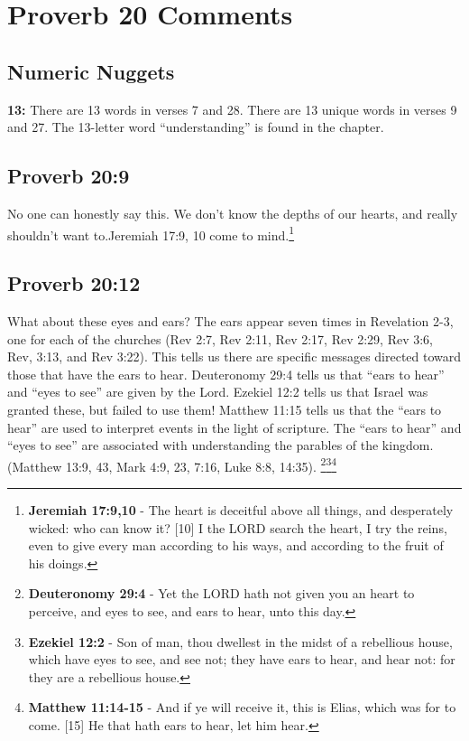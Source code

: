 \section{Proverb 20 Comments}

\subsection{Numeric Nuggets}
\textbf{13:} There are 13 words in verses 7 and 28. There are 13 unique words in verses 9 and 27. The 13-letter word ``understanding'' is found in the chapter.

\subsection{Proverb 20:9}
No one can honestly say this. We don't know the depths of our hearts, and really shouldn't want to.Jeremiah 17:9, 10 come to mind.\footnote{\textbf{Jeremiah 17:9,10} - The heart is deceitful above all things, and desperately wicked: who can know it? [10] I the LORD search the heart, I try the reins, even to give every man according to his ways, and according to the fruit of his doings.}

\subsection{Proverb 20:12}
What about these eyes and ears? The ears appear seven times in Revelation 2-3, one for each of the churches (Rev 2:7, Rev 2:11, Rev 2:17, Rev 2:29, Rev 3:6, Rev, 3:13, and Rev 3:22). This tells us there are specific messages directed toward those that have the ears to hear. Deuteronomy 29:4 tells us that ``ears to hear'' and ``eyes to see'' are given by the Lord. Ezekiel 12:2 tells us that Israel was granted these, but failed to use them! Matthew 11:15 tells us that the ``ears to hear'' are used to interpret events in the light of scripture. The ``ears to hear'' and ``eyes to see'' are associated with understanding the parables of the kingdom.(Matthew 13:9, 43, Mark 4:9, 23, 7:16, Luke 8:8, 14:35). \footnote{\textbf{Deuteronomy 29:4} - Yet the LORD hath not given you an heart to perceive, and eyes to see, and ears to hear, unto this day.}\footnote{\textbf{Ezekiel 12:2} - Son of man, thou dwellest in the midst of a rebellious house, which have eyes to see, and see not; they have ears to hear, and hear not: for they are a rebellious house.}\footnote{\textbf{Matthew 11:14-15} - And if ye will receive it, this is Elias, which was for to come. [15] He that hath ears to hear, let him hear.}

